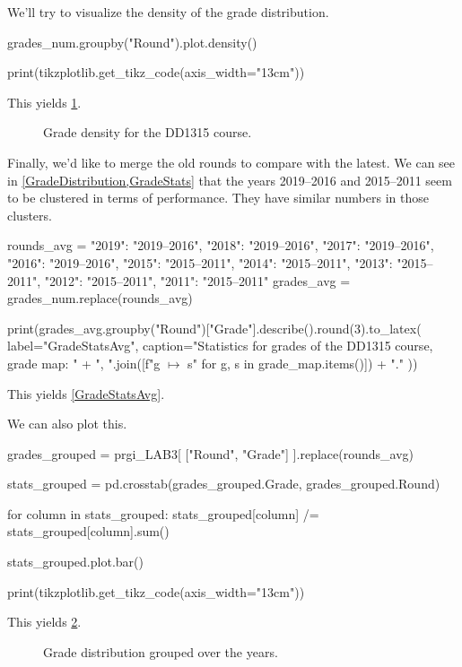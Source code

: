 \stdoutpythontex

We'll try to visualize the density of the grade distribution.
\begin{pyblock}[statstest][numbers=left,firstnumber=last]
grades_num.groupby("Round").plot.density()

print(tikzplotlib.get_tikz_code(axis_width="13cm"))
\end{pyblock}
This yields \cref{GradeDensityFig}.

\begin{figure}
  \centering
  \stdoutpythontex
  \caption{Grade density for the DD1315 course.}
  \label{GradeDensityFig}
\end{figure}

Finally, we'd like to merge the old rounds to compare with the latest.
We can see in \cref{GradeDistribution,GradeStats} that the years 2019--2016 and 
2015--2011 seem to be clustered in terms of performance.
They have similar numbers in those clusters.
\begin{pyblock}[statstest][numbers=left,firstnumber=last]
rounds_avg = {
  "2019": "2019--2016",
  "2018": "2019--2016",
  "2017": "2019--2016",
  "2016": "2019--2016",
  "2015": "2015--2011",
  "2014": "2015--2011",
  "2013": "2015--2011",
  "2012": "2015--2011",
  "2011": "2015--2011"
}
grades_avg = grades_num.replace(rounds_avg)

print(grades_avg.groupby("Round")["Grade"].describe().round(3).to_latex(
  label="GradeStatsAvg",
  caption="Statistics for grades of the DD1315 course, grade map: " +
    ", ".join([f"{g} $\mapsto$ {s}" for g, s in grade_map.items()]) + "."
))
\end{pyblock}
This yields \cref{GradeStatsAvg}.

\stdoutpythontex

We can also plot this.
\begin{pyblock}[statstest][numbers=left,firstnumber=last]
grades_grouped = prgi_LAB3[ ["Round", "Grade"] ].replace(rounds_avg)

stats_grouped = pd.crosstab(grades_grouped.Grade, grades_grouped.Round)

for column in stats_grouped:
  stats_grouped[column] /= stats_grouped[column].sum()

stats_grouped.plot.bar()

print(tikzplotlib.get_tikz_code(axis_width="13cm"))
\end{pyblock}
This yields \cref{GradeDistGroupedFig}.

\begin{figure}
  \centering
  \stdoutpythontex
  \caption{Grade distribution grouped over the years.}
  \label{GradeDistGroupedFig}
\end{figure}

